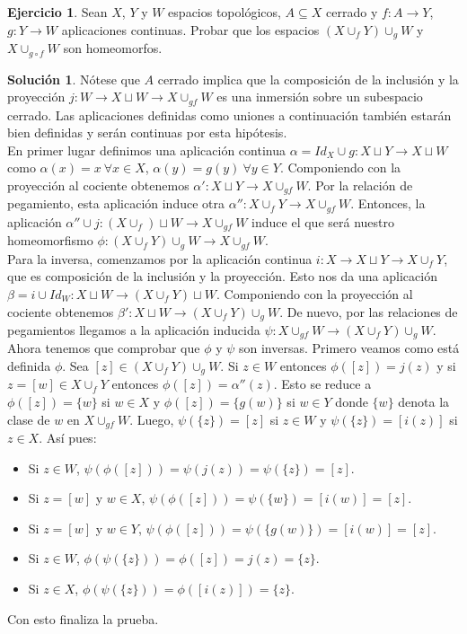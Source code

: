 \documentclass{article}
\theoremstyle{plain}
\theoremstyle{definition}
\newtheorem{exercise}{Ejercicio}
\newtheorem*{sol*}{Solución}
\begin{document}
\newpage
\begin{exercise}
Sean $X$, $Y$ y $W$ espacios topológicos, $A \subseteq X$ cerrado y $f : A \to Y$, $g : Y \to W$ aplicaciones continuas. Probar que los espacios $(X \cup_f Y) \cup_g W$ y $X \cup _{g \circ f} W$ son homeomorfos.
\end{exercise}
\begin{sol*}
Nótese que $A$ cerrado implica que la composición de la inclusión y la proyección $j:W\to X\sqcup W\to X\cup_{gf}W$ es una inmersión sobre un subespacio cerrado. Las aplicaciones definidas como uniones a continuación también estarán bien definidas y serán continuas por esta hipótesis.\\
En primer lugar definimos una aplicación continua $\alpha=Id_X\cup g:X\sqcup Y\to X\sqcup W$ como $\alpha(x)=x\ \forall x\in X$, $\alpha(y)=g(y)\ \forall y\in Y$. Componiendo con la proyección al cociente obtenemos $\alpha':X\sqcup Y\to X\cup_{gf} W$. Por la relación de pegamiento, esta aplicación induce otra $\alpha'':X\cup_f Y\to X\cup_{gf} W$. Entonces, la aplicación $\alpha''\cup j:(X\cup_f)\sqcup W\to X\cup_{gf}W$ induce el que será nuestro homeomorfismo $\phi:(X\cup_f Y)\cup_g W\to X\cup_{gf} W$.\\
Para la inversa, comenzamos por la aplicación continua $i:X\to X\sqcup Y\to X\cup_f Y$, que es composición de la inclusión y la proyección. Esto nos da una aplicación $\beta=i\cup Id_W:X\sqcup W\to (X\cup_f Y)\sqcup W$. Componiendo con la proyección al cociente obtenemos $\beta':X\sqcup W\to (X\cup_f Y)\cup_g W$. De nuevo, por las relaciones de pegamientos llegamos a la aplicación inducida $\psi:X\cup_{gf} W\to (X\cup_f Y)\cup_g W$.\\
Ahora tenemos que comprobar que $\phi$ y $\psi$ son inversas. Primero veamos como está definida $\phi$. Sea $[z]\in (X\cup_f Y)\cup_g W$. Si $z\in W$ entonces $\phi([z])=j(z)$ y si $z=[w]\in X\cup_f Y$ entonces $\phi([z])=\alpha''(z)$. Esto se reduce a $\phi([z])=\{w\}$ si $w\in X$ y $\phi([z])=\{g(w)\}$ si $w\in Y$ donde $\{w\}$ denota la clase de $w$ en $X\cup_{gf}W$. Luego, $\psi(\{z\})=[z]$ si $z\in W$ y $\psi(\{z\})=[i(z)]$ si $z\in X$. Así pues:
\begin{itemize}
\item Si $z\in W$, $\psi(\phi([z])) = \psi(j(z)) = \psi(\{z\}) = [z]$.
\item Si $z=[w]$ y $w\in X$, $\psi(\phi([z])) = \psi(\{w\}) = [i(w)] = [z]$.
\item Si $z=[w]$ y $w\in Y$, $\psi(\phi([z])) = \psi(\{g(w)\}) = [i(w)] = [z]$. 
\item Si $z\in W$, $\phi(\psi(\{z\})) = \phi([z]) = j(z) = \{ z \}$.
\item Si $z\in X$, $\phi(\psi(\{z\})) = \phi([i(z)]) = \{z\}$. 
\end{itemize}
Con esto finaliza la prueba.
\end{sol*}
\end{document}
